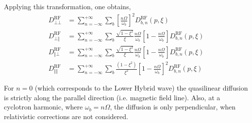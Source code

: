 Applying this transformation, one obtains,
\begin{align}
D_{\bot\bot}^{\text{RF}} &  =\sum_{n=-\infty}^{+\infty}\sum_{b}\left[
\frac{n\Omega}{\omega_{b}}\right]  ^{2}D_{b,n}^{\text{RF}}(p,\xi
)\label{dcyl1}\\
D_{\bot\Vert}^{\text{RF}} &  =\sum_{n=-\infty}^{+\infty}\sum_{b}\frac
{\sqrt{1-\xi^{2}}}{\xi}\frac{n\Omega}{\omega_{b}}\left[  1-\frac{n\Omega
}{\omega_{b}}\right]  D_{b,n}^{\text{RF}}(p,\xi)\\
D_{\Vert\bot}^{\text{RF}} &  =\sum_{n=-\infty}^{+\infty}\sum_{b}\frac
{\sqrt{1-\xi^{2}}}{\xi}\frac{n\Omega}{\omega_{b}}\left[  1-\frac{n\Omega
}{\omega_{b}}\right]  D_{b,n}^{\text{RF}}(p,\xi)\\
D_{\Vert\Vert}^{\text{RF}} &  =\sum_{n=-\infty}^{+\infty}\sum_{b}\frac
{(1-\xi^{2})}{\xi^{2}}\left[  1-\frac{n\Omega}{\omega_{b}}\right]  ^{2}%
D_{b,n}^{\text{RF}}(p,\xi)\label{dcyl4}%
\end{align}

For $n=0$ (which corresponds to the Lower Hybrid wave) the quasilinear
diffusion is strictly along the parallel direction (i.e. magnetic field line).
Also, at a cyclotron harmonic, where $\omega_{b}=n\Omega$, the diffusion is
only perpendicular, when relativistic corrections are not considered.
